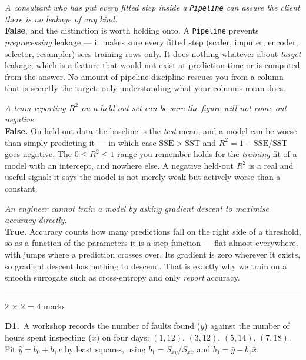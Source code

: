\documentclass[10pt,a4paper]{article}
\newcommand{\parthead}[2]{\vspace{2pt}\noindent\rule{\linewidth}{0.4pt}\par\vspace{2pt}%
  \noindent{\bfseries Part #1}\hfill{\small #2}\par\vspace{1pt}}
\begin{document}
\begin{sC}

  \item \emph{A consultant who has put every fitted step inside a \texttt{Pipeline} can assure the client there is no leakage of any kind.}\\[2pt] \textbf{False}, and the distinction is worth holding onto. A \texttt{Pipeline} prevents \emph{preprocessing} leakage --- it makes sure every fitted step (scaler, imputer, encoder, selector, resampler) sees training rows only. It does nothing whatever about \emph{target} leakage, which is a feature that would not exist at prediction time or is computed from the answer. No amount of pipeline discipline rescues you from a column that is secretly the target; only understanding what your columns mean does.

  \item \emph{A team reporting $R^2$ on a held-out set can be sure the figure will not come out negative.}\\[2pt] \textbf{False.} On held-out data the baseline is the \emph{test} mean, and a model can be worse than simply predicting it --- in which case $\mathrm{SSE} > \mathrm{SST}$ and $R^2 = 1 - \mathrm{SSE}/\mathrm{SST}$ goes negative. The $0 \le R^2 \le 1$ range you remember holds for the \emph{training} fit of a model with an intercept, and nowhere else. A negative held-out $R^2$ is a real and useful signal: it says the model is not merely weak but actively worse than a constant.

  \item \emph{An engineer cannot train a model by asking gradient descent to maximise accuracy directly.}\\[2pt] \textbf{True.} Accuracy counts how many predictions fall on the right side of a threshold, so as a function of the parameters it is a step function --- flat almost everywhere, with jumps where a prediction crosses over. Its gradient is zero wherever it exists, so gradient descent has nothing to descend. That is exactly why we train on a smooth surrogate such as cross-entropy and only \emph{report} accuracy.

\end{sC}

\newpage

\parthead{D --- Short answer}{2 $\times$ 2 = 4 marks}

\textbf{D1.}\ A workshop records the number of faults found ($y$) against the number of hours spent inspecting ($x$) on four days: $(1,12)$, $(3,12)$, $(5,14)$, $(7,18)$. Fit $\hat y = b_0 + b_1 x$ by least squares, using $b_1 = S_{xy}/S_{xx}$ and $b_0 = \bar y - b_1\bar x$.
\end{document}
